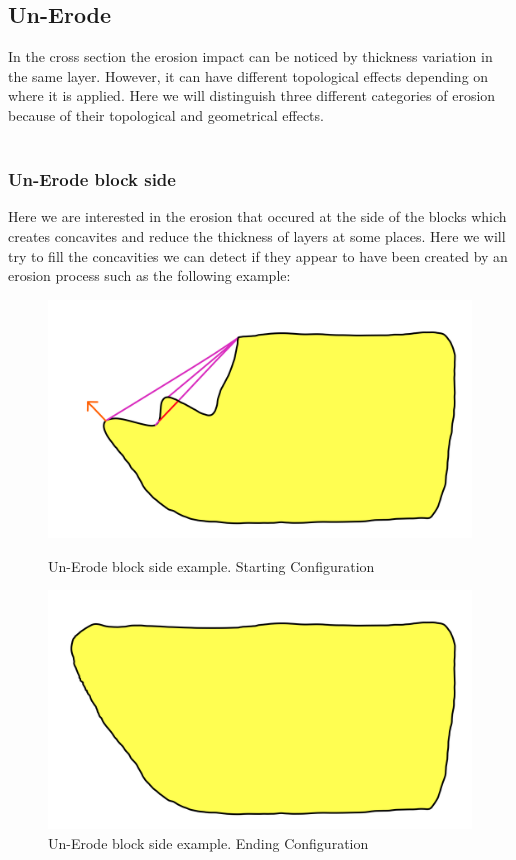 \documentclass[12pt, a4paper]{report} %
\begin{document}
\subsection{Un-Erode}
\label{sub:unerode}

In the cross section the erosion impact can be noticed by thickness variation in the same layer. However, it can have different topological effects depending on where it is applied. Here we will distinguish three different categories of erosion because of their topological and geometrical effects.\\\\

\subsubsection{Un-Erode block side}
Here we are interested in the erosion that occured at the side of the blocks which creates concavites and reduce the thickness of layers at some places. Here we will try to fill the concavities we can detect if they appear to have been created by an erosion process such as the following example:
\begin{figure}[H]
    \begin{minipage}[c]{.46\linewidth}
        \centering
        \includegraphics[scale=0.2]{unErodeSideDescription0.png}
	\caption{Un-Erode block side example. Starting Configuration}
    \end{minipage}
    \hfill%
    \begin{minipage}[c]{.46\linewidth}
        \centering
        \includegraphics[scale=0.2]{unErodeSideDescription1.png}
	\caption{Un-Erode block side example. Ending Configuration}
    \end{minipage}
\end{figure}\\
\end{document}
